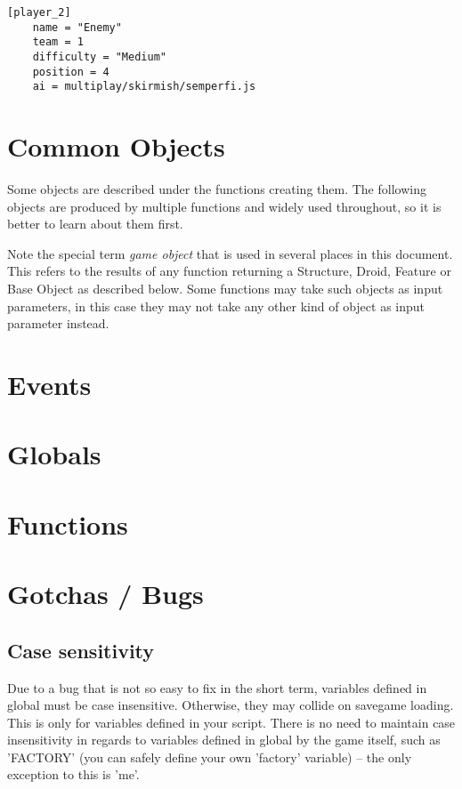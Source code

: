 \documentclass[12pt]{article}
\begin{document}
\begin{lstlisting}[]
	[player_2]
	name = "Enemy"
	team = 1
	difficulty = "Medium"
	position = 4
	ai = multiplay/skirmish/semperfi.js
\end{lstlisting}

\section{Common Objects}

Some objects are described under the functions creating them. The following objects are produced by
multiple functions and widely used throughout, so it is better to learn about them first.

Note the special term \emph{game object} that is used in several places in this document. This refers
to the results of any function returning a Structure, Droid, Feature or Base Object as described below.
Some functions may take such objects as input parameters, in this case they may not take any other kind
of object as input parameter instead.



\section{Events}



\section{Globals}

\begin{description}

\end{description}

\section{Functions}



\section{Gotchas / Bugs}

\subsection{Case sensitivity}
Due to a bug that is not so easy to fix in the short term, variables defined in global must be case insensitive.
Otherwise, they may collide on savegame loading. This is only for variables defined in your script. There is no
need to maintain case insensitivity in regards to variables defined in global by the game itself, such as 'FACTORY'
(you can safely define your own 'factory' variable) -- the only exception to this is 'me'.
\end{document}
